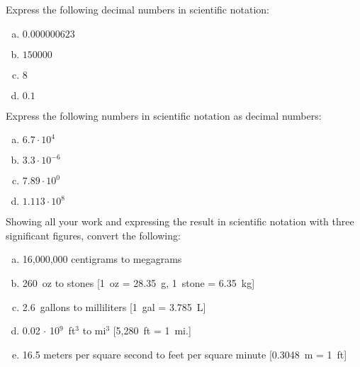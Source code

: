 \documentclass[11pt,letterpaper]{article}
\begin{document}

 Express the following decimal numbers in scientific notation:
	\begin{enumerate}[(a)]
	\item $0.000000623$
	\item $150000$
	\item $8$
	\item $0.1$
	\end{enumerate}



\newpage



 Express the following numbers in scientific notation as decimal numbers:
	\begin{enumerate}[(a)]
	\item $6.7 \cdot 10^4$
	\item $3.3 \cdot 10^{-6}$
	\item $7.89 \cdot 10^0$
	\item $1.113 \cdot 10^8$
	\end{enumerate}



\newpage



 Showing all your work and expressing the result in scientific notation with three significant figures, convert the following:
	\begin{enumerate}[(a)]
	\item 16,000,000 centigrams to megagrams
	\item 260~oz to stones [1~oz = 28.35~g, 1~stone = 6.35~kg]
	\item 2.6~gallons to milliliters [1~gal = 3.785~L]
	\item 0.02 $\cdot$ 10$^9$~ft$^3$ to mi$^3$ [5,280~ft = 1~mi.]
	\item 16.5 meters per square second to feet per square minute [0.3048~m = 1~ft]
	\end{enumerate}
\end{document}
